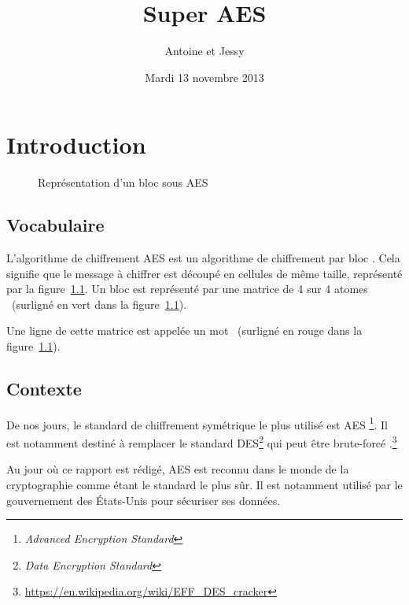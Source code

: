 \documentclass[12pt,a4paper]{report}
\title{\og Super AES \fg}
\author{Antoine \bsc{Catton} et Jessy \bsc{Mauclair-Richalet}}
\date{Mardi 13 novembre 2013}
\begin{document}
\maketitle

\tableofcontents

\chapter{Introduction}

\begin{figure}[h!]
\centering
{}
\label{fig:aesbloc}
\caption{Représentation d'un bloc sous AES}
\end{figure}

\section{Vocabulaire}

L'algorithme de chiffrement AES est un algorithme de chiffrement \og par bloc
\fg.  Cela signifie que le message à chiffrer est découpé en cellules de même
taille, représenté par la figure~\ref{fig:aesbloc}. Un bloc est représenté par
une matrice de 4 sur 4 \og atomes \fg\ (surligné en vert dans la
figure~\ref{fig:aesbloc}).

Une ligne de cette matrice est appelée un \og mot \fg\ (surligné en rouge dans
la figure~\ref{fig:aesbloc}).

\section{Contexte}

De nos jours, le standard de chiffrement symétrique le plus utilisé est AES
\footnote{\emph{Advanced Encryption Standard}}.  Il est notamment destiné à remplacer le
standard DES\footnote{\emph{Data Encryption Standard}} qui peut être
\og brute-forcé \fg.\footnote{\url{https://en.wikipedia.org/wiki/EFF_DES_cracker}}

Au jour où ce rapport est rédigé, AES est reconnu dans le monde de la
cryptographie comme étant le standard le plus sûr. Il est notamment utilisé par
le gouvernement des États-Unis pour sécuriser ses données.
\end{document}

